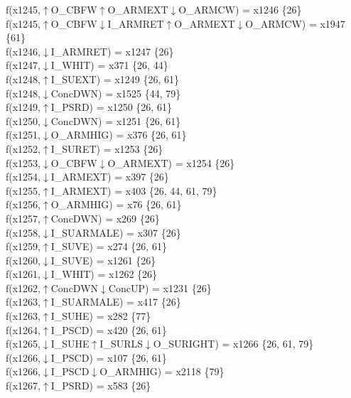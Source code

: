 f(x1245,$\uparrow$O\_CBFW$\uparrow$O\_ARMEXT$\downarrow$O\_ARMCW) = x1246 \{26\} \\  
f(x1245,$\uparrow$O\_CBFW$\downarrow$I\_ARMRET$\uparrow$O\_ARMEXT$\downarrow$O\_ARMCW) = x1947 \{61\} \\  
f(x1246,$\downarrow$I\_ARMRET) = x1247 \{26\} \\  
f(x1247,$\downarrow$I\_WHIT) = x371 \{26, 44\} \\  
f(x1248,$\uparrow$I\_SUEXT) = x1249 \{26, 61\} \\  
f(x1248,$\downarrow$ConcDWN) = x1525 \{44, 79\} \\  
f(x1249,$\uparrow$I\_PSRD) = x1250 \{26, 61\} \\  
f(x1250,$\downarrow$ConcDWN) = x1251 \{26, 61\} \\  
f(x1251,$\downarrow$O\_ARMHIG) = x376 \{26, 61\} \\  
f(x1252,$\uparrow$I\_SURET) = x1253 \{26\} \\  
f(x1253,$\downarrow$O\_CBFW$\downarrow$O\_ARMEXT) = x1254 \{26\} \\  
f(x1254,$\downarrow$I\_ARMEXT) = x397 \{26\} \\  
f(x1255,$\uparrow$I\_ARMEXT) = x403 \{26, 44, 61, 79\} \\  
f(x1256,$\uparrow$O\_ARMHIG) = x76 \{26, 61\} \\  
f(x1257,$\uparrow$ConcDWN) = x269 \{26\} \\  
f(x1258,$\downarrow$I\_SUARMALE) = x307 \{26\} \\  
f(x1259,$\uparrow$I\_SUVE) = x274 \{26, 61\} \\  
f(x1260,$\downarrow$I\_SUVE) = x1261 \{26\} \\  
f(x1261,$\downarrow$I\_WHIT) = x1262 \{26\} \\  
f(x1262,$\uparrow$ConcDWN$\downarrow$ConcUP) = x1231 \{26\} \\  
f(x1263,$\uparrow$I\_SUARMALE) = x417 \{26\} \\  
f(x1263,$\uparrow$I\_SUHE) = x282 \{77\} \\  
f(x1264,$\uparrow$I\_PSCD) = x420 \{26, 61\} \\  
f(x1265,$\downarrow$I\_SUHE$\uparrow$I\_SURLS$\downarrow$O\_SURIGHT) = x1266 \{26, 61, 79\} \\  
f(x1266,$\downarrow$I\_PSCD) = x107 \{26, 61\} \\  
f(x1266,$\downarrow$I\_PSCD$\downarrow$O\_ARMHIG) = x2118 \{79\} \\  
f(x1267,$\uparrow$I\_PSRD) = x583 \{26\} \\  
